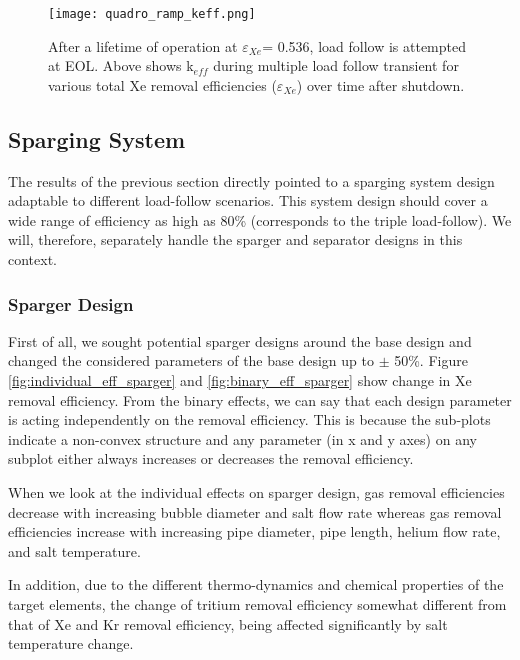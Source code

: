     \begin{figure}[htbp!]
        \begin{center}
            \texttt{[image: quadro\_ramp\_keff.png]}
        \end{center}
        \caption{After a lifetime of operation at $\varepsilon$$_{Xe}$= 0.536, 
            load follow is attempted at EOL. Above shows  k$_{eff}$ during 
            multiple load follow transient for various total Xe removal 
            efficiencies
        ($\varepsilon$$_{Xe}$) over time after shutdown.}
        \label{fig:quadro_keff}
    \end{figure}

\newpage
\FloatBarrier

\subsection{Sparging System}

    The results of the previous section directly pointed to a sparging system 
    design adaptable to different load-follow scenarios. This system design 
    should cover a wide range of efficiency as high as 80\% (corresponds to the 
    triple load-follow). We will, therefore, separately handle the sparger and 
    separator designs in this context.

\subsubsection{Sparger Design}

    First of all, we sought potential sparger designs around the base design 
    and changed the considered parameters of the base design up to $\pm$ 50\%. 
    Figure \ref{fig:individual_eff_sparger} and \ref{fig:binary_eff_sparger} 
    show change in Xe removal efficiency. From the binary effects, we can say 
    that each design parameter is acting independently on the removal 
    efficiency. This is because the sub-plots indicate a non-convex structure 
    and any parameter (in x and y axes) on any subplot either always increases 
    or decreases the removal efficiency.

    When we look at the individual effects on sparger design, gas removal 
    efficiencies decrease with increasing bubble diameter and salt flow rate 
    whereas gas removal efficiencies increase with increasing pipe diameter, 
    pipe length, helium flow rate, and salt temperature.

    In addition, due to the different thermo-dynamics and chemical properties 
    of the target elements, the change of tritium removal efficiency somewhat 
    different from that of Xe and Kr removal efficiency, being affected 
    significantly by salt temperature change.

